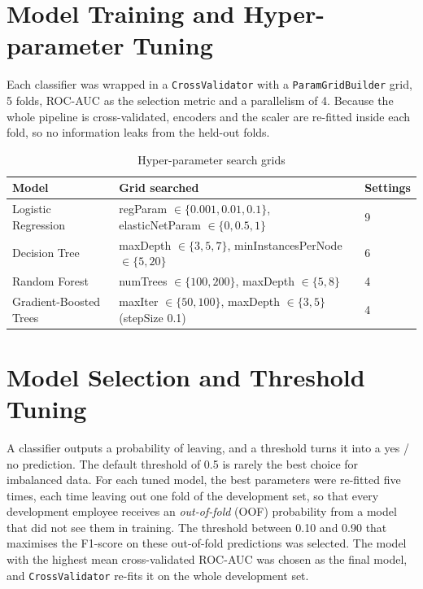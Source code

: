\documentclass[12pt,a4paper]{report}
\begin{document}
\section{Model Training and Hyper-parameter Tuning}

Each classifier was wrapped in a \texttt{CrossValidator} with a \texttt{ParamGridBuilder} grid, 5 folds, ROC-AUC as the selection metric and a parallelism of 4. Because the whole pipeline is cross-validated, encoders and the scaler are re-fitted inside each fold, so no information leaks from the held-out folds.

\begin{table}[H]
\centering
\caption{Hyper-parameter search grids}
\label{tab:grid}
\small
\begin{tabularx}{\textwidth}{|P{3.6cm}|L|P{1.4cm}|}
\hline
\textbf{Model} & \textbf{Grid searched} & \textbf{Settings} \\ \hline
Logistic Regression & regParam $\in\{0.001, 0.01, 0.1\}$, elasticNetParam $\in\{0, 0.5, 1\}$ & 9 \\ \hline
Decision Tree & maxDepth $\in\{3, 5, 7\}$, minInstancesPerNode $\in\{5, 20\}$ & 6 \\ \hline
Random Forest & numTrees $\in\{100, 200\}$, maxDepth $\in\{5, 8\}$ & 4 \\ \hline
Gradient-Boosted Trees & maxIter $\in\{50, 100\}$, maxDepth $\in\{3, 5\}$ (stepSize 0.1) & 4 \\ \hline
\end{tabularx}
\end{table}

\section{Model Selection and Threshold Tuning}

A classifier outputs a probability of leaving, and a threshold turns it into a yes / no prediction. The default threshold of 0.5 is rarely the best choice for imbalanced data. For each tuned model, the best parameters were re-fitted five times, each time leaving out one fold of the development set, so that every development employee receives an \emph{out-of-fold} (OOF) probability from a model that did not see them in training. The threshold between 0.10 and 0.90 that maximises the F1-score on these out-of-fold predictions was selected. The model with the highest mean cross-validated ROC-AUC was chosen as the final model, and \texttt{CrossValidator} re-fits it on the whole development set.
\end{document}
